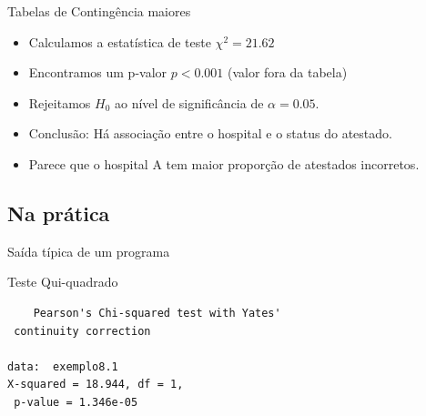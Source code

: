 \documentclass{beamer}
\begin{document}
\begin{frame}{Tabelas de Contingência maiores}
  \begin{itemize}
  \item Calculamos a estatística de teste $\chi^2 = 21.62$
  \item Encontramos um p-valor $p<0.001$ (valor fora da tabela)
  \item Rejeitamos $H_0$ ao nível de significância de $\alpha = 0.05$.
  \item Conclusão: Há associação entre o hospital e o status do atestado.
  \item Parece que o hospital A tem maior proporção de atestados incorretos.
  \end{itemize}
\end{frame}





\subsection{Na prática}


\begin{frame}[fragile]{Saída típica de um programa}
  \begin{block}{Teste Qui-quadrado}
    \footnotesize
\begin{verbatim}
	Pearson's Chi-squared test with Yates'
 continuity correction

data:  exemplo8.1
X-squared = 18.944, df = 1,
 p-value = 1.346e-05
\end{verbatim}
  \end{block}
\end{frame}
\end{document}
